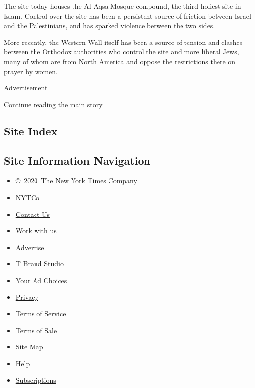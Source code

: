 The site today houses the Al Aqsa Mosque compound, the third holiest
site in Islam. Control over the site has been a persistent source of
friction between Israel and the Palestinians, and has sparked violence
between the two sides.

More recently, the Western Wall itself has been a source of tension and
clashes between the Orthodox authorities who control the site and more
liberal Jews, many of whom are from North America and oppose the
restrictions there on prayer by women.

Advertisement

\protect\hyperlink{after-bottom}{Continue reading the main story}

\hypertarget{site-index}{%
\subsection{Site Index}\label{site-index}}

\hypertarget{site-information-navigation}{%
\subsection{Site Information
Navigation}\label{site-information-navigation}}

\begin{itemize}
\tightlist
\item
  \href{https://help.nytimes.com/hc/en-us/articles/115014792127-Copyright-notice}{©~2020~The
  New York Times Company}
\end{itemize}

\begin{itemize}
\tightlist
\item
  \href{https://www.nytco.com/}{NYTCo}
\item
  \href{https://help.nytimes.com/hc/en-us/articles/115015385887-Contact-Us}{Contact
  Us}
\item
  \href{https://www.nytco.com/careers/}{Work with us}
\item
  \href{https://nytmediakit.com/}{Advertise}
\item
  \href{http://www.tbrandstudio.com/}{T Brand Studio}
\item
  \href{https://www.nytimes.com/privacy/cookie-policy\#how-do-i-manage-trackers}{Your
  Ad Choices}
\item
  \href{https://www.nytimes.com/privacy}{Privacy}
\item
  \href{https://help.nytimes.com/hc/en-us/articles/115014893428-Terms-of-service}{Terms
  of Service}
\item
  \href{https://help.nytimes.com/hc/en-us/articles/115014893968-Terms-of-sale}{Terms
  of Sale}
\item
  \href{https://spiderbites.nytimes.com}{Site Map}
\item
  \href{https://help.nytimes.com/hc/en-us}{Help}
\item
  \href{https://www.nytimes.com/subscription?campaignId=37WXW}{Subscriptions}
\end{itemize}
